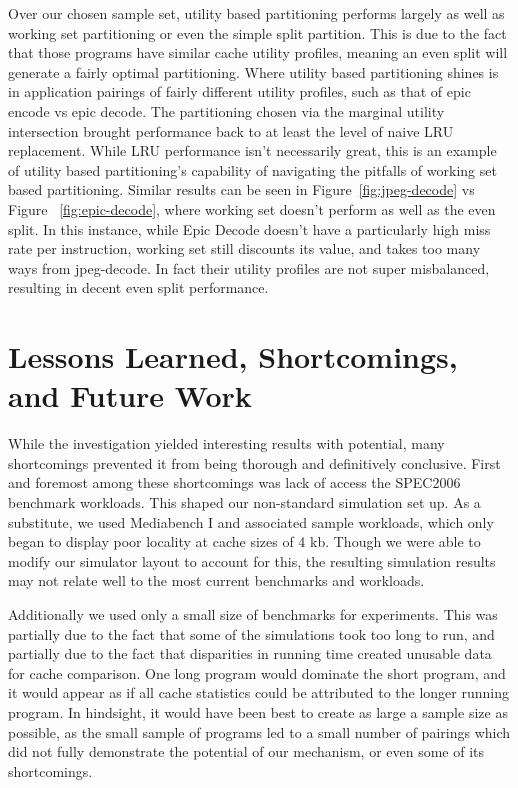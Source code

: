 \documentclass{acm_proc_article-sp}
\begin{document}
Over our chosen sample set, utility based partitioning performs largely as well as working set partitioning or even the simple split partition. This is due to the fact that those programs have similar cache utility profiles, meaning an even split
will generate a fairly optimal partitioning. Where utility based partitioning shines is in application pairings of fairly different
utility profiles, such as that of epic encode vs epic decode. The partitioning chosen via the marginal utility intersection brought performance back to at least the level of naive LRU replacement. While LRU performance isn't necessarily great,  this is an example of utility based partitioning's capability of navigating the pitfalls of working set based partitioning. Similar results can be seen in Figure~\ref{fig:jpeg-decode} vs Figure ~\ref{fig:epic-decode}, where working set doesn't perform as well as the even split. In this instance, while Epic Decode doesn't have a particularly high miss rate per instruction, working set still discounts its value, and takes too many ways from jpeg-decode.  In fact their utility profiles are not super misbalanced, resulting in decent even split performance.

\section{Lessons Learned, Shortcomings, and Future Work}
 
While the investigation yielded interesting results with potential, many shortcomings prevented it from being thorough and definitively conclusive. First and foremost among these shortcomings was lack of access the SPEC2006 benchmark workloads. This shaped our non-standard simulation set up. As a substitute, we used Mediabench I and associated sample workloads, which only began to display poor locality at cache sizes of 4 kb. Though we were able to modify our simulator layout to account for this, the resulting simulation results may not relate well to the most current benchmarks and workloads.

Additionally we used only a small size of benchmarks for experiments. This was partially due to the fact that some of the simulations took too long to run, and partially due to the fact that disparities in running time created unusable data for
cache comparison. One long program would dominate the short program, and it would appear as if all cache statistics could be attributed to the longer running program. In hindsight, it would have been best to create as large a sample size
as possible, as the small sample of programs led to a small number of pairings which did not fully demonstrate the potential of our mechanism, or even some of its shortcomings.
\end{document}
